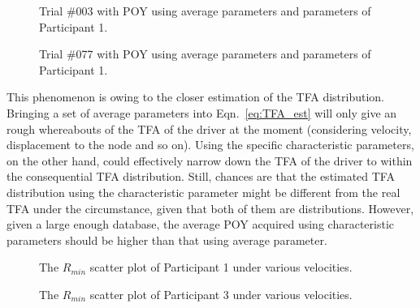 \begin{figure}[htbp!]
\begin{center}
\end{center}
\caption{Trial \#003 with POY using average parameters and parameters of Participant 1.}
\label{fig:trial003params} 
\end{figure}

\begin{figure}[htbp!]
\begin{center}
\end{center}
\caption{Trial \#077 with POY using average parameters and parameters of Participant 1.}
\label{fig:trial077params} 
\end{figure}


This phenomenon is owing to the closer estimation of the TFA distribution. Bringing a set of average parameters into Eqn.~\ref{eq:TFA_est} will only give an rough whereabouts of the TFA of the driver at the moment (considering velocity, displacement to the node and so on). Using the specific characteristic parameters, on the other hand, could effectively narrow down the TFA of the driver to within the consequential TFA distribution. Still, chances are that the estimated TFA distribution using the characteristic parameter might be different from the real TFA under the circumstance, given that both of them are distributions. However, given a large enough database, the average POY acquired using characteristic parameters should be higher than that using average parameter.


\begin{figure}[htbp!]
\begin{center}
\end{center}
\caption{The $R_{min}$ scatter plot of Participant 1 under various velocities.}
\label{fig:Par1RMINDifSpeed} 
\end{figure}

\begin{figure}[htbp!]
\begin{center}
\end{center}
\caption{The $R_{min}$ scatter plot of Participant 3 under various velocities.}
\label{fig:Par3RMINDifSpeed} 
\end{figure}

